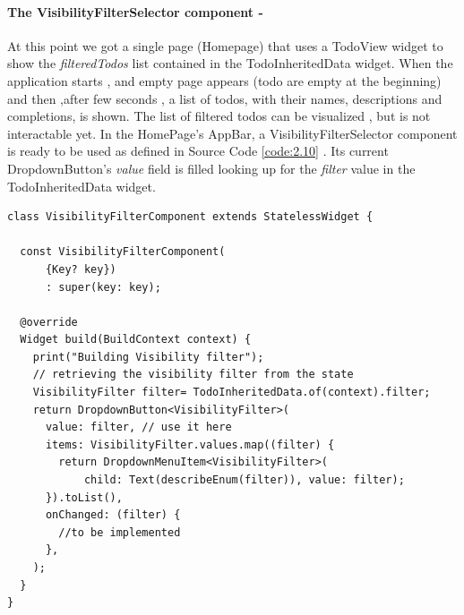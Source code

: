 \paragraph{The VisibilityFilterSelector component - }
\label{subpar:todo_app_inherited_widget_visibilityfiltercomponent_component}
At this point we got a single page (Homepage) that uses a TodoView widget to show the \textit{filteredTodos} list contained in the TodoInheritedData widget. When the application starts , and empty page appears (todo are empty at the beginning) and then ,after few seconds , a list of todos, with their names, descriptions and completions, is shown. The list of filtered todos can be visualized , but is not interactable yet. 
In the HomePage’s AppBar, a VisibilityFilterSelector component is ready to be used as defined in Source Code \ref{code:2.10} . Its current DropdownButton’s \textit{value} field is filled looking up for the \textit{filter} value in the TodoInheritedData widget. 
\mbox{}\\
\begin{code}

 \mbox{}

\label{code:2.23}
\begin{verbatim}
class VisibilityFilterComponent extends StatelessWidget {

  const VisibilityFilterComponent(
      {Key? key})
      : super(key: key);

  @override
  Widget build(BuildContext context) {
    print("Building Visibility filter");
    // retrieving the visibility filter from the state
    VisibilityFilter filter= TodoInheritedData.of(context).filter;
    return DropdownButton<VisibilityFilter>(
      value: filter, // use it here
      items: VisibilityFilter.values.map((filter) {
        return DropdownMenuItem<VisibilityFilter>(
            child: Text(describeEnum(filter)), value: filter);
      }).toList(),
      onChanged: (filter) {
        //to be implemented
      },
    );
  }
}
\end{verbatim}
\end{code}
\mbox{}\\

